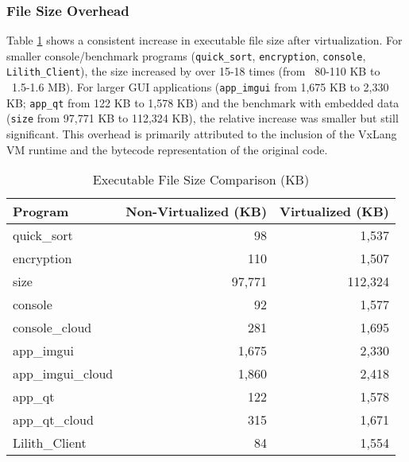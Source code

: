 \subsubsection{File Size Overhead}
Table \ref{tab:file_size_jurnal_ui_ana_en} shows a consistent increase in executable file size after virtualization. For smaller console/benchmark programs (\texttt{quick\_sort}, \texttt{encryption}, \texttt{console}, \texttt{Lilith\_Client}), the size increased by over 15-18 times (from ~80-110 KB to ~1.5-1.6 MB). For larger GUI applications (\texttt{app\_imgui} from 1,675 KB to 2,330 KB; \texttt{app\_qt} from 122 KB to 1,578 KB) and the benchmark with embedded data (\texttt{size} from 97,771 KB to 112,324 KB), the relative increase was smaller but still significant. This overhead is primarily attributed to the inclusion of the VxLang VM runtime and the bytecode representation of the original code.
\begin{table}[H]
    \centering
    \caption{Executable File Size Comparison (KB)}
    \label{tab:file_size_jurnal_ui_ana_en}
    \fontsize{10}{12}\selectfont %
        \begin{tabular}{@{}lrr@{}}
            \toprule
            \textbf{Program}  & \textbf{Non-Virtualized (KB)} & \textbf{Virtualized (KB)} \\
            \midrule
            quick\_sort       & 98                            & 1,537                     \\
            encryption        & 110                           & 1,507                     \\
            size              & 97,771                        & 112,324                   \\
            console           & 92                            & 1,577                     \\
            console\_cloud    & 281                           & 1,695                     \\
            app\_imgui        & 1,675                         & 2,330                     \\
            app\_imgui\_cloud & 1,860                         & 2,418                     \\
            app\_qt           & 122                           & 1,578                     \\
            app\_qt\_cloud    & 315                           & 1,671                     \\
            Lilith\_Client    & 84                            & 1,554                     \\
            \bottomrule
        \end{tabular}
\end{table}

